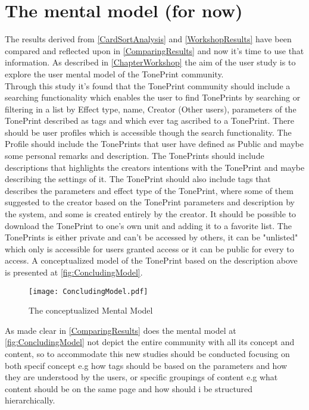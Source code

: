 \section{The mental model (for now)}
\label{MentalModelForNow}
The results derived from \autoref{CardSortAnalysis} and \autoref{WorkshopResults} have been compared and reflected upon in \autoref{ComparingResults} and now it's time to use that information. As described in \autoref{ChapterWorkshop} the aim of the user study is to explore the user mental model of the TonePrint community.\\ 
Through this study it's found that the TonePrint community should include a searching functionality which enables the user to find TonePrints by searching or filtering in a list by Effect type, name, Creator (Other users), parameters of the TonePrint described as tags and which ever tag ascribed to a TonePrint. There should be user profiles which is accessible though the search functionality. The Profile should include the TonePrints that user have defined as Public and maybe some personal remarks and description. The TonePrints should include descriptions that highlights the creators intentions with the TonePrint and maybe describing the settings of it. The TonePrint should also include tags that describes the parameters and effect type of the TonePrint, where some of them suggested to the creator based on the TonePrint parameters and description by the system, and some is created entirely by the creator. It should be possible to download the TonePrint to one's own unit and adding it to a favorite list. The TonePrints is either private and can't be accessed by others, it can be "unlisted" which only is accessible for users granted access or it can be public for every to access. A conceptualized model of the TonePrint based on the description above is presented at \autoref{fig:ConcludingModel}.\\
%
\begin{figure}[H]
	\centering
	\texttt{[image: ConcludingModel.pdf]}
	\caption{The conceptualized Mental Model}
	\label{fig:ConcludingModel}
\end{figure}
%
\noindent
As made clear in \autoref{ComparingResults} does the mental model at \autoref{fig:ConcludingModel} not depict the entire community with all its concept and content, so to accommodate this new studies should be conducted focusing on both specif concept e.g how tags should be based on the parameters and how they are understood by the users, or specific groupings of content e.g what content should be on the same page and how should i be structured hierarchically. \\

